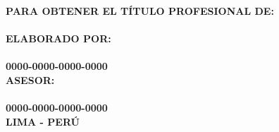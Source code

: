 \begin{titlepage}
\begin{center}
        \vspace{5 mm}
        {\large \textbf{PARA OBTENER EL TÍTULO PROFESIONAL DE:} }\\
        \vspace{5 mm}
        {\large \textbf{\@grado} }\\
        \vspace{10 mm}
        {\large \textbf{ELABORADO POR:} }\\
        \vspace{5 mm}
        {\large \textbf{\@authorcaratula} }\\
        \vspace{5 mm}
        {\large \textbf{0000-0000-0000-0000} }\\
        \vspace{10 mm}
        {\large \textbf{ASESOR:} }\\
        \vspace{5 mm}
        {\large \textbf{\@asesor} }\\
        \vspace{5 mm}
        {\large \textbf{0000-0000-0000-0000} }\\
        \vspace{10 mm}
        {\large \textbf{LIMA - PERÚ} }\\
        \vspace{5 mm}
        {\large \textbf{\@yyearr} }\\

    \end{center}

\end{titlepage}